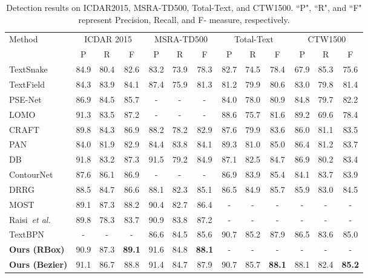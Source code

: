 \documentclass[10pt,twocolumn,letterpaper]{article}
\begin{document}
\begin{table*}[tb]
    \centering
    \setlength{\tabcolsep}{8pt}
    \begin{tabular}{lcccccccccccc}
    \toprule
    \multirow{2}{*}{Method} & \multicolumn{3}{c}{ICDAR 2015} & \multicolumn{3}{c}{MSRA-TD500} & \multicolumn{3}{c}{Total-Text} & \multicolumn{3}{c}{CTW1500}\\
    ~ & P & R & F & P & R & F& P & R & F& P & R & F \\ \midrule
TextSnake~\cite{TextSnake} & 84.9  & 80.4  & 82.6 & 83.2  & 73.9  & 78.3 & 82.7  & 74.5  & 78.4  & 67.9  & 85.3  & 75.6 \\
    TextField~\cite{TextField} & 84.3 & 83.9 & 84.1 & 87.4 & 75.9 & 81.3  & 81.2          & 79.9          & 80.6  & 83.0          & 79.8          & 81.4  \\
    PSE-Net~\cite{PSE-Net} & 86.9 & 84.5 & 85.7  &-&-&-& 84.0          & 78.0          & 80.9   & 84.8          & 79.7          & 82.2   \\
    LOMO~\cite{LOMO} & 91.3  & 83.5  & 87.2 &-&-&-& 88.6 & 75.7  & 81.6  & 89.2 & 69.6 & 78.4\\
CRAFT~\cite{CRAFT} & 89.8 & 84.3 & 86.9 & 88.2 & 78.2 & 82.9    & 87.6          & 79.9          & 83.6  & 86.0          & 81.1          & 83.5   \\
    PAN~\cite{PAN} & 84.0 & 81.9 & 82.9 & 84.4 & 83.8 & 84.1   & 89.3          & 81.0          & 85.0 & 86.4          & 81.2          & 83.7  \\
    DB~\cite{DB} & 91.8 & 83.2 & 87.3  & 91.5 & 79.2 & 84.9  & 87.1          & 82.5          & 84.7   & 86.9          & 80.2          & 83.4   \\
    ContourNet~\cite{ContourNet} & 87.6 & 86.1 & 86.9 &-&-&-& 86.9          & 83.9          & 85.4   & 84.1          & 83.7          & 83.9  \\
    DRRG~\cite{RRG-Net} & 88.5 & 84.7 & 86.6  & 88.1 & 82.3 & 85.1 & 86.5          & 84.9            & 85.7  & 85.9          & 83.0            & 84.5  \\
MOST~\cite{MOST} & 89.1 & 87.3 & 88.2 & 90.4 & 82.7 & 86.4 &-&-&-&-&-&-\\
    Raisi~\emph{et al.}~\cite{raisi2021transformer} & 89.8 & 78.3 & 83.7 & 90.9 & 83.8 & 87.2 &-&-&-&-&-&- \\
    TextBPN~\cite{TextBPN} &-&-&-&86.6&84.5&85.6&90.7&85.2&87.9&86.5&83.6&85.0 \\
    \midrule
    \textbf{Ours (RBox)} & 90.9 & 87.3 & \textbf{89.1} & 91.6 & 84.8 & \textbf{88.1} &-&-&-&-&-&- \\ 
    \textbf{Ours (Bezier)} &91.1	&86.7	&88.8 &91.4	&84.7	&87.9 & 90.7 & 85.7 &\textbf{88.1}& 88.1  & 82.4	& \textbf{85.2} \\\bottomrule

    \end{tabular}
    \caption{Detection results on ICDAR2015, MSRA-TD500, Total-Text, and CTW1500. ``P", ``R", and ``F" represent Precision, Recall, and F-
measure, respectively.}
    \label{tab:benchmarks}
\end{table*}
\end{document}
